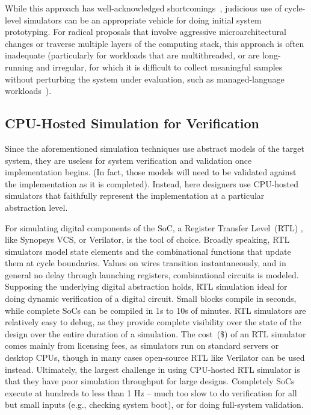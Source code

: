 While this approach has well-acknowledged shortcomings~\cite{gem5error},
judicious use of cycle-level simulators can be an appropriate vehicle for
doing initial system prototyping. For radical proposals that involve
aggressive microarchitectural changes or traverse multiple layers of the
computing stack, this approach is often inadequate (particularly for workloads that
are multithreaded, or are long-running and irregular, for which it is difficult to collect 
meaningful samples without perturbing the system under evaluation, such as
managed-language workloads~\cite{MicroSimPanel}).


\subsection{CPU-Hosted Simulation for Verification}

Since the aforementioned simulation techniques use abstract models of the
target system, they are useless for system verification and validation once
implementation begins. (In fact, those models will need to be validated against the
implementation as it is completed). Instead, here designers use CPU-hosted
simulators that faithfully represent the implementation at a particular
abstraction level.

For simulating digital components of the SoC, a Register Transfer Level~(RTL) ,
like Synopsys VCS, or Verilator, is the tool of choice. Broadly speaking, RTL
simulators model state elements and the combinational functions that update
them at cycle boundaries. Values on wires transition instantaneously, and in
general no delay through launching registers, combinational circuits is
modeled. Supposing the underlying digital abstraction holds, RTL simulation
ideal for doing dynamic verification of a digital circuit. Small blocks compile
in seconds, while complete SoCs can be compiled in 1s to 10s of minutes. RTL
simulators are relatively easy to debug, as they provide complete visibility
over the state of the design over the entire duration of a simulation. The
cost~(\$) of an RTL simulator comes mainly from licensing fees, as simulators
run on standard servers or desktop CPUs, though in many cases open-source RTL
like Verilator can be used instead. Ultimately, the largest challenge in using
CPU-hosted RTL simulator is that they have poor simulation throughput for large
designs. Completely SoCs execute at hundreds to less than 1 Hz -- much too slow
to do verification for all but small inputs (e.g., checking system boot), or
for doing full-system validation.

